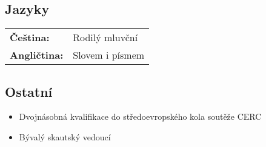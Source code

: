 \documentclass[a4paper]{article}
\begin{document}
\subsection*{Jazyky}
\begin{tabular}{>{\bfseries}l l}
	Čeština: & Rodilý mluvční \\
	Angličtina: & Slovem i písmem
\end{tabular}

\subsection*{Ostatní}
\begin{itemize}
	\item Dvojnásobná kvalifikace do středoevropského kola soutěže CERC
	\item Bývalý skautský vedoucí
\end{itemize}
\end{document}
